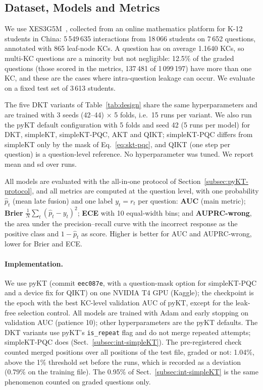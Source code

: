 \subsection{Dataset, Models and Metrics}
\label{subsec:data}
We use XES3G5M~\cite{liu2023xes3g5m}, collected from an online mathematics platform for K-12 students in China: 5\,549\,635 interactions from 18\,066 students on 7\,652 questions, annotated with 865 leaf-node KCs.
A question has on average 1.1640 KCs, so multi-KC questions are a minority but not negligible: 12.5\% of the graded questions (those scored in the metrics, 137\,481 of 1\,099\,197) have more than one KC, and these are the cases where intra-question leakage can occur.
We evaluate on a fixed test set of 3\,613 students.
 
The five DKT variants of Table~\ref{tab:design} share the same hyperparameters and are trained with 3 seeds (42--44) $\times$ 5 folds, i.e.\ 15 runs per variant. 
We also run the pyKT default configuration with 5 folds and seed 42 (5 runs per model) for DKT, simpleKT, simpleKT-PQC, AKT and QIKT; simpleKT-PQC differs from simpleKT only by the mask of Eq.~\eqref{eq:skt-pqc}, and QIKT (one step per question) is a question-level reference. 
No hyperparameter was tuned. We report mean and sd over runs.
 
All models are evaluated with the all-in-one protocol of Section~\ref{subsec:pyKT-protocol}, and all metrics are computed at the question level, with one probability $\hat p_t$ (mean late fusion) and one label $y_t=r_t$ per question: \textbf{AUC} (main metric); \textbf{Brier} $\frac1N\sum_t(\hat p_t-y_t)^2$; \textbf{ECE} with 10 equal-width bins; and \textbf{AUPRC-wrong}, the area under the precision--recall curve with the incorrect response as the positive class and $1-\hat p_t$ as score. 
Higher is better for AUC and AUPRC-wrong, lower for Brier and ECE.
 
\paragraph{Implementation.}
We use pyKT (commit \texttt{eec087e}, with a question-mask option for simpleKT-PQC and a device fix for QIKT) on one NVIDIA T4 GPU (Kaggle); the checkpoint is the epoch with the best KC-level validation AUC of pyKT, except for the leak-free selection control. All models are trained with Adam and early stopping on validation AUC (patience 10); other hyperparameters are the pyKT defaults. The DKT variants use pyKT's \texttt{is\_repeat} flag and do not merge repeated attempts; simpleKT-PQC does (Sect.~\ref{subsec:int-simpleKT}). The pre-registered check counted merged positions over all positions of the
test file, graded or not: 1.04\%, above the 1\% threshold set before the runs,
which is recorded as a deviation (0.79\% on the training file). The 0.95\% of
Sect.~\ref{subsec:int-simpleKT} is the same phenomenon counted on graded questions only.

